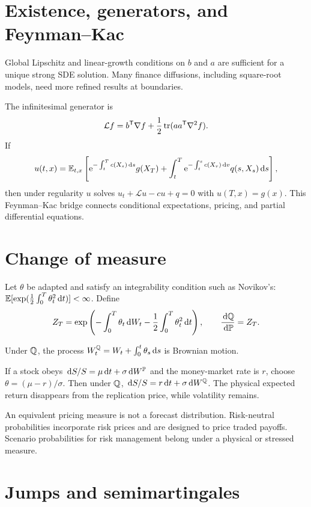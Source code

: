 \section{Existence, generators, and Feynman--Kac}

Global Lipschitz and linear-growth conditions on $b$ and $a$ are sufficient for a
unique strong SDE solution. Many finance diffusions, including square-root models,
need more refined results at boundaries.

The infinitesimal generator is
\[
\mathcal Lf=b^\mathsf T\nabla f+
\frac12\operatorname{tr}(aa^\mathsf T\nabla^2f).
\]
If
\[
u(t,x)=\operatorname{\mathbb E}_{t,x}\left[
\mathrm e^{-\int_t^Tc(X_s)\,\mathrm d s}g(X_T)
+\int_t^T\mathrm e^{-\int_t^sc(X_v)\,\mathrm d v}q(s,X_s)\,\mathrm d s
\right],
\]
then under regularity $u$ solves
$u_t+\mathcal Lu-cu+q=0$ with $u(T,x)=g(x)$. This Feynman--Kac bridge connects
conditional expectations, pricing, and partial differential equations.

\section{Change of measure}

Let $\theta$ be adapted and satisfy an integrability condition such as Novikov's:
$\operatorname{\mathbb E}[\exp(\frac12\int_0^T\theta_t^2\,\mathrm d t)]<\infty$. Define
\[
Z_T=\exp\left(
-\int_0^T\theta_t\,\mathrm d W_t-\frac12\int_0^T\theta_t^2\,\mathrm d t
\right),\qquad
\frac{\,\mathrm d\mathbb Q}{\,\mathrm d\mathbb P}=Z_T.
\]

\begin{theorem}[Girsanov]
Under $\mathbb Q$, the process
$W_t^\mathbb Q=W_t+\int_0^t\theta_s\,\mathrm d s$ is Brownian motion.
\end{theorem}

If a stock obeys $\,\mathrm d S/S=\mu\,\mathrm d t+\sigma\,\mathrm d W^\mathbb P$ and the money-market rate is
$r$, choose $\theta=(\mu-r)/\sigma$. Then under $\mathbb Q$,
$\,\mathrm d S/S=r\,\mathrm d t+\sigma\,\mathrm d W^\mathbb Q$. The physical expected return disappears from the
replication price, while volatility remains.

\begin{warning}
An equivalent pricing measure is not a forecast distribution. Risk-neutral
probabilities incorporate risk prices and are designed to price traded payoffs.
Scenario probabilities for risk management belong under a physical or stressed
measure.
\end{warning}

\section{Jumps and semimartingales}

